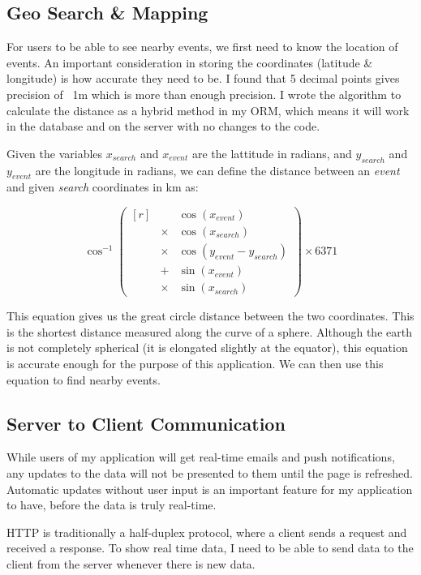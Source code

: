 \documentclass[a4paper,oneside,12pt]{report}
\begin{document}
	\subsection{Geo Search \& Mapping}
	For users to be able to see nearby events, we first need to know the location of events. An important consideration in storing the coordinates (latitude \& longitude) is how accurate they need to be. I found that 5 decimal points gives precision of ~1m which is more than enough precision. I wrote the algorithm to calculate the distance as a hybrid method in my ORM, which means it will work in the database and on the server with no changes to the code.
	
	Given the variables \(x_{search}\) and \(x_{event}\) are the lattitude in radians, and \(y_{search}\) and \(y_{event}\) are the longitude in radians, we can define the distance between an \textit{event} and given \textit{search} coordinates in \si{\kilo\metre} as:
	
	\begin{equation*}	
		\cos^{-1}
		\begin{pmatrix*}[r]
			&&\cos(x_{event}) \\
			&\times &\cos(x_{search})\\
			&\times &\cos(y_{event} - y_{search})\\
			&+      &\sin(x_{event})\\
			&\times &\sin(x_{search})
		\end{pmatrix*} \times 6371
	\end{equation*}
	
	This equation gives us the great circle distance between the two coordinates. This is the shortest distance measured along the curve of a sphere. Although the earth is not completely spherical (it is elongated slightly at the equator), this equation is accurate enough for the purpose of this application. We can then use this equation to find nearby events.

	\subsection{Server to Client Communication}
	While users of my application will get real-time emails and push notifications, any updates to the data will not be presented to them until the page is refreshed. Automatic updates without user input is an important feature for my application to have, before the data is truly real-time. 
	
	HTTP is traditionally a half-duplex protocol, where a client sends a request and received a response. To show real time data, I need to be able to send data to the client from the server whenever there is new data. 
	
\end{document}
